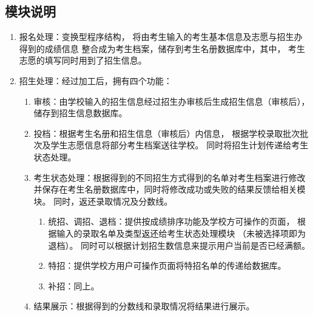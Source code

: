 \documentclass[CJK,utf8]{ctexrep}
\begin{document}
\subsection*{模块说明}
\begin{enumerate}
	\item 报名处理：变换型程序结构，
	将由考生输入的考生基本信息及志愿与招生办得到的成绩信息
	整合成为考生档案，储存到考生名册数据库中，其中，
	考生志愿的填写同时用到了招生信息。
	\item 招生处理：经过加工后，拥有四个功能：
	\begin{enumerate}
		\item 审核：由学校输入的招生信息经过招生办审核后生成招生信息（审核后），
		储存到招生信息数据库。
		\item 投档：根据考生名册和招生信息（审核后）内信息，
		根据学校录取批次批次及学生志愿信息将部分考生档案送往学校。
		同时将招生计划传递给考生状态处理。
		\item 考生状态处理：根据得到的不同招生方式得到的名单对考生档案进行修改
		并保存在考生名册数据库中，同时将修改成功或失败的结果反馈给相关模块。
		同时，返还录取情况及分数线。
		\begin{enumerate}
			\item 统招、调招、退档：提供按成绩排序功能及学校方可操作的页面，
			根据输入的录取名单及类型返还给考生状态处理模块
			（未被选择项即为退档）。
			同时可以根据计划招生数信息来提示用户当前是否已经满额。
			\item 特招：提供学校方用户可操作页面将特招名单的传递给数据库。
			\item 补招：同上。
		\end{enumerate}
		\item 结果展示：根据得到的分数线和录取情况将结果进行展示。
	\end{enumerate}
\end{enumerate}
\end{document}
